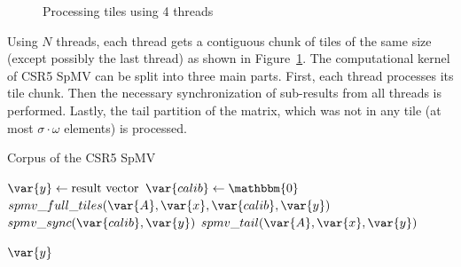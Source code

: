 \documentclass[thesis=M,english]{FITthesis}[2019/12/23]
\begin{document}
\begin{figure}[htp]
    \centering
    \caption{Processing tiles using 4 threads}\label{csr5:thr_dist}
\end{figure}

Using \(N\) threads, each thread gets a contiguous chunk of tiles of the same size (except possibly the
last thread) as shown in Figure~\ref{csr5:thr_dist}. The computational kernel of CSR5 SpMV can be split into three main parts.
First, each thread processes
its tile chunk. Then the necessary synchronization of sub-results from all threads is performed.
Lastly, the tail partition of the matrix, which was not in any tile (at most \(\sigma{} \cdot \omega\) elements)
is processed.

\begin{algorithm}[h]
    \caption{Corpus of the CSR5 SpMV}
    \begin{algorithmic}
        \State \(\var{y} \gets \text{result vector}\)
        \State \(\var{calib} \gets \mathbbm{0}\)
        \State \(spmv\_full\_tiles(\var{A}, \var{x}, \var{calib}, \var{y})\)
        \State \(spmv\_sync(\var{calib}, \var{y})\)
        \State \(spmv\_tail(\var{A}, \var{x}, \var{y})\)

        \Return $\var{y}$
        \EndFunction
    \end{algorithmic}
\end{algorithm}
\end{document}
